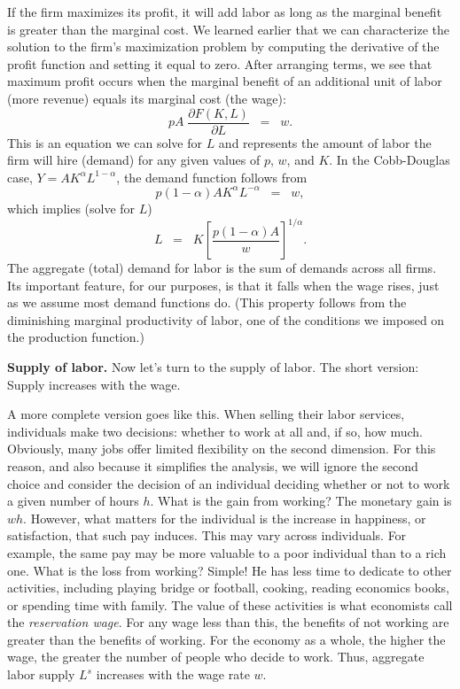 If the firm maximizes its profit, it will add labor as
long as the marginal benefit is greater than the marginal cost.
We learned earlier that we can characterize the solution
to the firm's maximization problem by computing the derivative
of the profit function and setting it equal to zero.
After arranging terms, we see that maximum profit occurs
when the marginal benefit of an additional unit of labor (more revenue)
equals its marginal cost (the wage):
\[
    p A \; \frac{\partial F(K,L)}{\partial L} \;\;=\;\; w .
\]
%
This is an equation we can solve for $L$ and represents the amount
of labor the firm will hire (demand) for any given values of $p$,
$w$, and $K$.  In the Cobb-Douglas case,
$ Y = A K^\alpha L^{1-\alpha}$,
the demand function follows from
%
\begin{equation*}
    p (1-\alpha) A K^{\alpha}L^{-\alpha} \;\;=\;\; w ,
\end{equation*}
%
which implies (solve for $L$)
%
\begin{equation}
    L \;\;=\;\; K\left[\frac{ p (1-\alpha) A}{w}\right]^{{1}/{\alpha}}.
    \label{eq:ld}
\end{equation}
%
The aggregate (total) demand for labor is the sum of demands
across all firms. Its important feature, for our purposes, is that
it falls when the wage rises, just as we assume most demand
functions do.
(This property follows from the diminishing marginal
productivity of labor, one of the conditions we imposed on the
production function.)

\textbf{Supply of labor.}
Now let's turn to the supply of labor. The short version: Supply
increases with the wage.

A more complete version goes like this.
When selling their labor services, individuals
make two decisions: whether to work at all and, if so, how much.
Obviously, many jobs offer limited flexibility on the
second dimension.  For this reason, and also because it simplifies
the analysis, we will ignore the second choice and consider the
decision of an individual deciding whether or not to work a given
number of hours $h$.  What is the gain from working? The monetary
gain is $wh$. However, what matters for the individual is the
increase in happiness, or satisfaction, that such pay induces.
This may vary across individuals.  For example, the same pay may
be more valuable to a poor individual than to a rich one. What is
the loss from working? Simple!  He has less time to dedicate to
other activities, including playing bridge or football, cooking,
reading economics books, or spending time with family.
The value of these
activities is what economists call the \textit{reservation wage}.
For any wage less than this, the benefits of not working are
greater than the benefits of working. For the economy as a whole,
the higher the wage, the greater the number of people
who decide to work.
Thus, aggregate labor supply $L^{s}$ increases with the wage rate
$w$.


